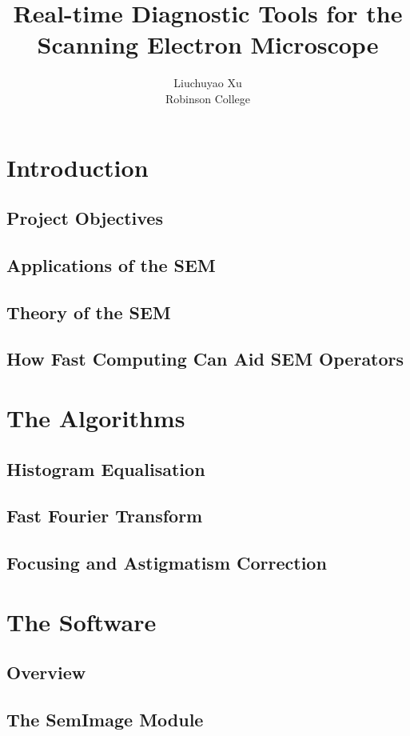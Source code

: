 \documentclass{article}
\title{Real-time Diagnostic Tools for the Scanning Electron Microscope}
\author{Liuchuyao Xu\\Robinson College}
\begin{document}
\maketitle
\tableofcontents

\newpage
\section{Introduction}
\subsection{Project Objectives}
\subsection{Applications of the SEM}
\subsection{Theory of the SEM}
\subsection{How Fast Computing Can Aid SEM Operators}

\section{The Algorithms}
\subsection{Histogram Equalisation}
\subsection{Fast Fourier Transform}
\subsection{Focusing and Astigmatism Correction}

\section{The Software}
\subsection{Overview}
\subsection{The SemImage Module}
\end{document}
